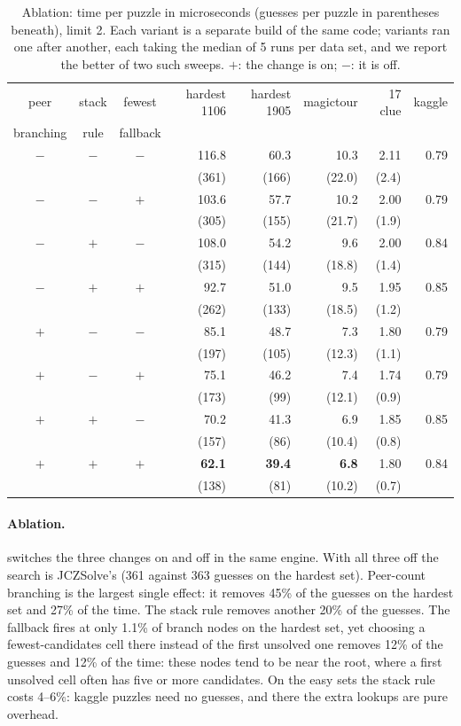 \documentclass[11pt]{article}
\theoremstyle{definition}
\theoremstyle{plain}
\begin{document}
\begin{table}[t]
\centering
\caption{Ablation: time per puzzle in microseconds (guesses per puzzle in parentheses beneath), limit 2. Each variant is a separate
build of the same code; variants ran one after another, each taking the median of 5 runs per data set, and we report
the better of two such sweeps. $+$: the change is on; $-$: it is off.}
\label{tab:ablation}
\small
\begin{tabular}{cccrrrrr}
\toprule
peer & stack & fewest & hardest 1106 & hardest 1905 & magictour & 17 clue & kaggle \\
branching & rule & fallback & & & & & \\
\midrule
$-$ & $-$ & $-$ & 116.8 & 60.3 & 10.3 & 2.11 & 0.79 \\
&&& (361) & (166) & (22.0) & (2.4) & \\[2pt]
$-$ & $-$ & $+$ & 103.6 & 57.7 & 10.2 & 2.00 & 0.79 \\
&&& (305) & (155) & (21.7) & (1.9) & \\[2pt]
$-$ & $+$ & $-$ & 108.0 & 54.2 & 9.6 & 2.00 & 0.84 \\
&&& (315) & (144) & (18.8) & (1.4) & \\[2pt]
$-$ & $+$ & $+$ & 92.7 & 51.0 & 9.5 & 1.95 & 0.85 \\
&&& (262) & (133) & (18.5) & (1.2) & \\[2pt]
$+$ & $-$ & $-$ & 85.1 & 48.7 & 7.3 & 1.80 & 0.79 \\
&&& (197) & (105) & (12.3) & (1.1) & \\[2pt]
$+$ & $-$ & $+$ & 75.1 & 46.2 & 7.4 & 1.74 & 0.79 \\
&&& (173) & (99) & (12.1) & (0.9) & \\[2pt]
$+$ & $+$ & $-$ & 70.2 & 41.3 & 6.9 & 1.85 & 0.85 \\
&&& (157) & (86) & (10.4) & (0.8) & \\[2pt]
$+$ & $+$ & $+$ & \textbf{62.1} & \textbf{39.4} & \textbf{6.8} & 1.80 & 0.84 \\
&&& (138) & (81) & (10.2) & (0.7) & \\[2pt]
\bottomrule
\end{tabular}
\end{table}

\paragraph{Ablation.}  switches the three changes on and off in the same engine. With all three off
the search is JCZSolve's (361 against 363 guesses on the hardest set). Peer-count branching is the largest single
effect: it removes 45\% of the guesses on the hardest set and 27\% of the time. The stack rule removes another 20\% of
the guesses. The fallback fires at only 1.1\% of branch nodes on the hardest set, yet choosing a fewest-candidates cell
there instead of the first unsolved one removes 12\% of the guesses and 12\% of the time: these nodes tend to be near
the root, where a first unsolved cell often has five or more candidates. On the easy sets the stack rule costs
4--6\%: kaggle puzzles need no guesses, and there the extra lookups are pure overhead.
\end{document}
